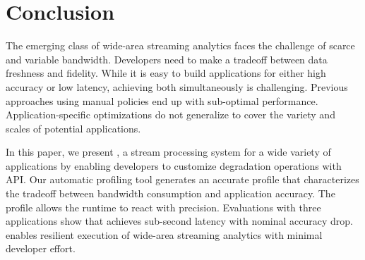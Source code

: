 \section{Conclusion}
\label{sec:conclusion}

The emerging class of wide-area streaming analytics faces the challenge of
scarce and variable bandwidth. Developers need to make a tradeoff between data
freshness and fidelity. While it is easy to build applications for either high
accuracy or low latency, achieving both simultaneously is challenging. Previous
approaches using manual policies end up with sub-optimal
performance. Application-specific optimizations do not generalize to cover the
variety and scales of potential applications.

In this paper, we present \sysname{}, a stream processing system for a wide
variety of applications by enabling developers to customize degradation
operations with \maybe{} API. Our automatic profiling tool generates an accurate
profile that characterizes the tradeoff between bandwidth consumption and
application accuracy. The profile allows the runtime to react with
precision. Evaluations with three applications show that \sysname{} achieves
sub-second latency with nominal accuracy drop. \sysname{} enables resilient
execution of wide-area streaming analytics with minimal developer effort.


